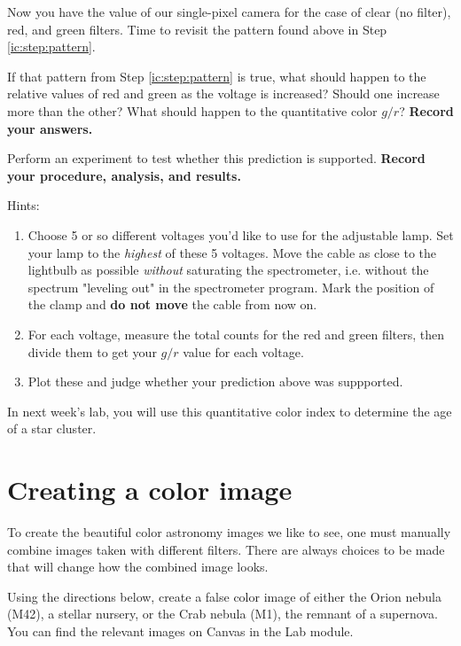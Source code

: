 Now you have the value of our single-pixel camera for the case of clear (no filter), red, and green filters. Time to revisit the pattern found above in Step \ref{ic:step:pattern}.

\begin{steps}
	\item If that pattern from Step \ref{ic:step:pattern} is true, what should happen to the relative values of red and green as the voltage is increased? Should one increase more than the other? What should happen to the quantitative color $g/r$? \textbf{Record your answers.}
	
	\item Perform an experiment to test whether this prediction is supported. \textbf{Record your procedure, analysis, and results.}
	
	Hints:
	
	\begin{enumerate}
		\item Choose 5 or so different voltages you'd like to use for the adjustable lamp.
		Set your lamp to the \emph{highest} of these 5 voltages. Move the cable as close to the lightbulb as possible
		\emph{without} saturating the spectrometer, i.e. without the spectrum "leveling
		out" in the spectrometer program. Mark the position of the clamp and \textbf{do
			not move} the cable from now on.
		
		\item For each voltage, measure the total counts for the red and green filters, then divide them to get your $g/r$ value for each voltage.
		
		\item Plot these and judge whether your prediction above was suppported.
	\end{enumerate}
\end{steps}

In next week's lab, you will use this quantitative color index to determine the age of a star cluster.

\section{Creating a color image}

To create the beautiful color astronomy images we like to see, one must manually combine images taken with different filters. There are always choices to be made that will change how the combined image looks.

\begin{steps}
	\item\label{ic:step:color-image} Using the directions below, create a
	false color image of either the Orion nebula (M42), a stellar nursery, or the
	Crab nebula (M1), the remnant of a supernova. You can find the relevant images
	on Canvas in the Lab module.  \end{steps}

